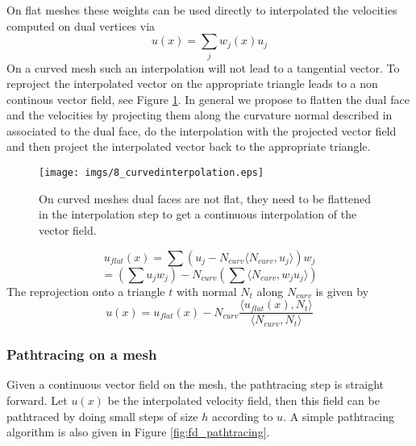 On flat meshes these weights can be used directly to interpolated the velocities computed on dual vertices via
\[u(x) = \sum_{j} w_j(x) u_j\] 
On a curved mesh such an interpolation will not lead to a tangential vector. To reproject the interpolated vector on the appropriate triangle leads to a non continous vector field, see Figure \ref{fig:fd_flatteninterpolation}. In general we propose to  flatten  the dual face and the velocities by projecting them along the curvature normal described in \cite{laplacebeltrami} associated to the dual face, do the interpolation with the projected vector field and then project the interpolated vector back to the appropriate triangle. 

\begin{figure}%
\begin{center}
\texttt{[image: imgs/8\_curvedinterpolation.eps]}%
\end{center}
\caption{On curved meshes dual faces are not flat, they need to be flattened in the interpolation step to get a continuous interpolation of the vector field.}%
\label{fig:fd_flatteninterpolation}%
\end{figure}

\[u_{flat}(x) = \sum (u_j - N_{curv} \langle N_{curv}, u_j \rangle) w_j\]
\[= (\sum u_j w_j )- N_{curv} (\sum \langle N_{curv}, w_j u_j \rangle)\]
The reprojection onto a triangle $t$ with normal $N_t$ along $N_{curv}$ is given by
\[u(x) = u_{flat}(x) - N_{curv} \frac{\langle u_{flat}(x), N_{t}\rangle}{ \langle N_{curv}, N_t \rangle}\]

\subsubsection{Pathtracing on a mesh}
Given a continuous vector field on the mesh, the pathtracing step is straight forward. Let $u(x)$ be the interpolated velocity field, then this field can be pathtraced by doing small steps of size $h$ according to $u$. A simple pathtracing algorithm is also given in Figure \ref{fig:fd_pathtracing}. 

